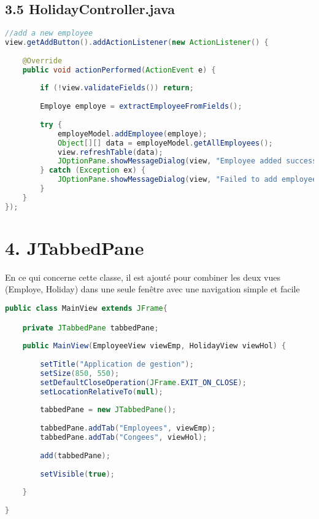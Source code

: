 \documentclass[a4paper,12pt]{report}
\begin{document}
\subsection*{\textcolor{mygreen}{3.5 HolidayController.java}}
\begin{lstlisting}[language=Java, caption=Action de la boutton Ajouter]
//add a new employee
view.getAddButton().addActionListener(new ActionListener() {
        
    @Override
    public void actionPerformed(ActionEvent e) {
        
        if (!view.validateFields()) return;			               
        
        Employe employe = extractEmployeeFromFields();
        
        try {
            employeModel.addEmployee(employe);
            Object[][] data = employeModel.getAllEmployees();
            view.refreshTable(data);
            JOptionPane.showMessageDialog(view, "Employee added successfully!", "Success", JOptionPane.INFORMATION_MESSAGE);
        } catch (Exception ex) {
            JOptionPane.showMessageDialog(view, "Failed to add employee: " + ex.getMessage(), "Error", JOptionPane.ERROR_MESSAGE);
        }
    }						
});
\end{lstlisting}

\section*{\textcolor{myblue}{4. JTabbedPane}}
En ce qui concerne cette classe, il est ajouté pour combiner les deux vues (Employe, Holiday) dans une seule fenêtre 
avec une navigation simple et facile 
\begin{lstlisting}[language=java, caption=le corps de la classe]
public class MainView extends JFrame{

	private JTabbedPane tabbedPane;
	
	public MainView(EmployeeView viewEmp, HolidayView viewHol) {
		
		setTitle("Application de gestion");
		setSize(850, 550);
		setDefaultCloseOperation(JFrame.EXIT_ON_CLOSE);
		setLocationRelativeTo(null);
		
		tabbedPane = new JTabbedPane();
		
		tabbedPane.addTab("Employees", viewEmp);
		tabbedPane.addTab("Congees", viewHol);
		
		add(tabbedPane);
		
		setVisible(true);
		
	}
		
}
\end{lstlisting}
\newpage
\end{document}
